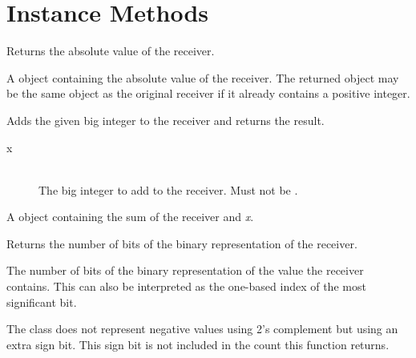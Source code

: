 \section{Instance Methods}



Returns the absolute value of the receiver.


\docretval

A  object containing the absolute value of the receiver. The returned object may be the same object as the original receiver if it already contains a positive integer.



Adds the given big integer to the receiver and returns the result.


\docparams

\begin{description}
\item[x] \hfill \\ The big integer to add to the receiver. Must not be .
\end{description}

\docretval

A  object containing the sum of the receiver and \emph{x}.



Returns the number of bits of the binary representation of the receiver.


\docretval

The number of bits of the binary representation of the value the receiver contains. This can also be interpreted as the one-based index of the most significant bit.

\docdiscuss

The  class does not represent negative values using 2's complement but using an extra sign bit. This sign bit is not included in the count this function returns.


